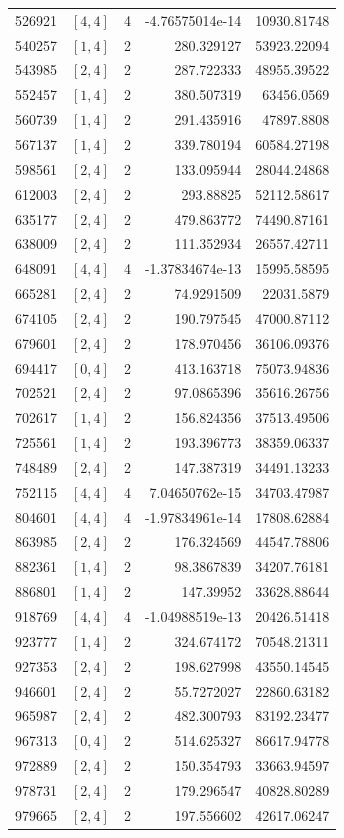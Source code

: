 \documentclass[11pt]{article}
\begin{document}
\begin{longtable}{r c c r r}
526921 & $[4,4]$ & 4 & -4.76575014e-14 & 10930.81748\\
540257 & $[1,4]$ & 2 & 280.329127 & 53923.22094\\
543985 & $[2,4]$ & 2 & 287.722333 & 48955.39522\\
552457 & $[1,4]$ & 2 & 380.507319 & 63456.0569\\
560739 & $[1,4]$ & 2 & 291.435916 & 47897.8808\\
567137 & $[1,4]$ & 2 & 339.780194 & 60584.27198\\
598561 & $[2,4]$ & 2 & 133.095944 & 28044.24868\\
612003 & $[2,4]$ & 2 & 293.88825 & 52112.58617\\
635177 & $[2,4]$ & 2 & 479.863772 & 74490.87161\\
638009 & $[2,4]$ & 2 & 111.352934 & 26557.42711\\
648091 & $[4,4]$ & 4 & -1.37834674e-13 & 15995.58595\\
665281 & $[2,4]$ & 2 & 74.9291509 & 22031.5879\\
674105 & $[2,4]$ & 2 & 190.797545 & 47000.87112\\
679601 & $[2,4]$ & 2 & 178.970456 & 36106.09376\\
694417 & $[0,4]$ & 2 & 413.163718 & 75073.94836\\
702521 & $[2,4]$ & 2 & 97.0865396 & 35616.26756\\
702617 & $[1,4]$ & 2 & 156.824356 & 37513.49506\\
725561 & $[1,4]$ & 2 & 193.396773 & 38359.06337\\
748489 & $[2,4]$ & 2 & 147.387319 & 34491.13233\\
752115 & $[4,4]$ & 4 & 7.04650762e-15 & 34703.47987\\
804601 & $[4,4]$ & 4 & -1.97834961e-14 & 17808.62884\\
863985 & $[2,4]$ & 2 & 176.324569 & 44547.78806\\
882361 & $[1,4]$ & 2 & 98.3867839 & 34207.76181\\
886801 & $[1,4]$ & 2 & 147.39952 & 33628.88644\\
918769 & $[4,4]$ & 4 & -1.04988519e-13 & 20426.51418\\
923777 & $[1,4]$ & 2 & 324.674172 & 70548.21311\\
927353 & $[2,4]$ & 2 & 198.627998 & 43550.14545\\
946601 & $[2,4]$ & 2 & 55.7272027 & 22860.63182\\
965987 & $[2,4]$ & 2 & 482.300793 & 83192.23477\\
967313 & $[0,4]$ & 2 & 514.625327 & 86617.94778\\
972889 & $[2,4]$ & 2 & 150.354793 & 33663.94597\\
978731 & $[2,4]$ & 2 & 179.296547 & 40828.80289\\
979665 & $[2,4]$ & 2 & 197.556602 & 42617.06247\\
\end{longtable}
\endgroup
\end{document}
